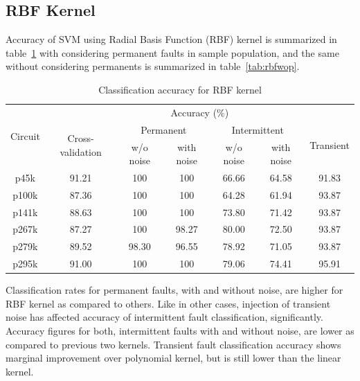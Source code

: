 \subsection{RBF Kernel}

Accuracy of SVM using Radial Basis Function (RBF) kernel is summarized in table~\ref{tab:rbfwp} with considering permanent faults in sample population, and the same without considering permanents is summarized in table~\ref{tab:rbfwop}.

\begin{table}[h]

	\captionsetup{justification=centering}
\begin{tabular}{ccccccc}
\hline
\multirow{3}{*}{Circuit} & \multicolumn{6}{c}{Accuracy (\%)}\\ \cline{2-7} 
                         & \multirow{2}{*}{Cross-validation} & \multicolumn{2}{c}{Permanent} & \multicolumn{2}{c}{Intermittent} & \multirow{2}{*}{Transient} \\ \cline{3-6}
                         &                                   & w/o noise     & with noise    & w/o noise      & with noise      &                            \\ \hline
p45k                     & 91.21                             & 100           & 100           & 66.66          & 64.58           & 91.83                      \\
p100k                    & 87.36                             & 100           & 100           & 64.28          & 61.94           & 93.87                      \\
p141k                    & 88.63                             & 100           & 100           & 73.80          & 71.42           & 93.87                      \\
p267k                    & 87.27                             & 100           & 98.27         & 80.00          & 72.50           & 93.87                      \\
p279k                    & 89.52                             & 98.30         & 96.55         & 78.92          & 71.05           & 93.87                      \\
p295k                    & 91.00                             & 100           & 100           & 79.06          & 74.41           & 95.91                     \\
\hline                                                     
\end{tabular}
\caption {Classification accuracy for RBF kernel}
\label{tab:rbfwp}
\end{table}
Classification rates for permanent faults, with and without noise, are higher for RBF kernel as compared to others. Like in other cases, injection of transient noise has affected accuracy of intermittent fault classification, significantly. Accuracy figures for both, intermittent faults with and without noise, are lower as compared to previous two kernels. Transient fault classification accuracy shows marginal improvement over polynomial kernel, but is still lower than the linear kernel.


